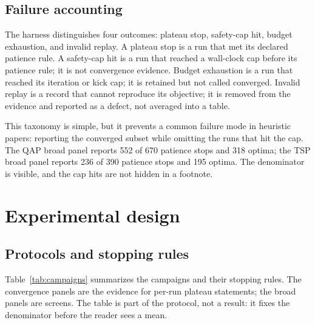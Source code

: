 \documentclass[pdflatex,sn-mathphys-num]{sn-jnl}
\begin{document}
\subsection{Failure accounting}

The harness distinguishes four outcomes: plateau stop, safety-cap hit, budget exhaustion, and
invalid replay. A plateau stop is a run that met its declared patience rule. A safety-cap hit is a
run that reached a wall-clock cap before its patience rule; it is not convergence evidence. Budget
exhaustion is a run that reached its iteration or kick cap; it is retained but not called converged.
Invalid replay is a record that cannot reproduce its objective; it is removed from the evidence and
reported as a defect, not averaged into a table.

This taxonomy is simple, but it prevents a common failure mode in heuristic papers: reporting the
converged subset while omitting the runs that hit the cap. The QAP broad panel reports 552 of 670
patience stops and 318 optima; the TSP broad panel reports 236 of 390 patience stops and 195 optima.
The denominator is visible, and the cap hits are not hidden in a footnote.

\section{Experimental design}
\label{sec:design}

\subsection{Protocols and stopping rules}

Table~\ref{tab:campaigns} summarizes the campaigns and their stopping rules. The convergence panels
are the evidence for per-run plateau statements; the broad panels are screens. The table is part of
the protocol, not a result: it fixes the denominator before the reader sees a mean.
\end{document}
